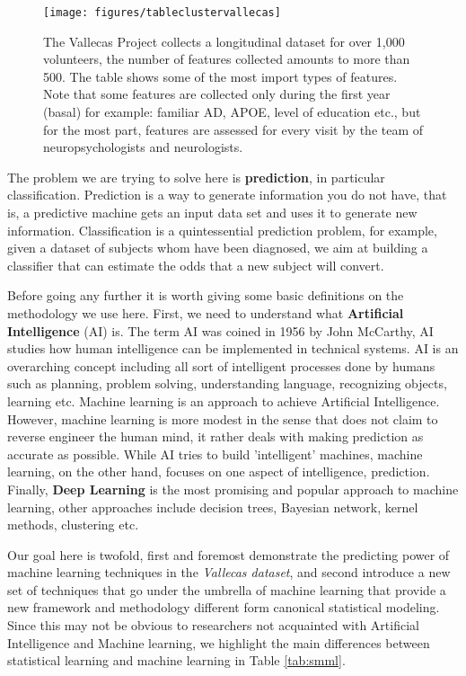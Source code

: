 \documentclass[11pt]{article}
\theoremstyle{definition}
\theoremstyle{remark}
\begin{document}
\begin{figure}[h]
        \centering
        \texttt{[image: figures/tableclustervallecas]}
        \caption{The Vallecas Project collects a longitudinal dataset for over 1,000 volunteers, the number of features collected amounts to more than 500. The table shows some of the most import types of features. Note that some features are collected only during the first year (basal) for example: familiar AD, APOE, level of education etc., but for the most part, features are assessed for every visit by the team of neuropsychologists and neurologists.} \label{fig:tableclustervallecas}
\end{figure}

The problem we are trying to solve here is \textbf{prediction}, in particular classification. 
Prediction is a way to generate information you do not have, that is, a predictive machine gets an input data set and uses it to generate new information. Classification is a quintessential prediction problem, for example, given a dataset of subjects whom have been diagnosed, we aim at building a classifier that can estimate the odds that a new subject will convert. 

Before going any further it is worth giving some basic definitions on the methodology we use here. First, we need to understand what \textbf{Artificial Intelligence} (AI) is. The term AI was coined in 1956 by John McCarthy, AI studies how human intelligence can be implemented in technical systems. AI is an overarching concept including all sort of intelligent processes done by humans such as planning, problem solving, understanding language, recognizing objects, learning etc. 
Machine learning is an approach to achieve Artificial Intelligence. However, machine learning is more modest in the sense that does not claim to reverse engineer the human mind, it rather deals with making prediction as accurate as possible. While AI tries to build 'intelligent' machines, machine learning, on the other hand, focuses on one aspect of intelligence, prediction.
Finally, \textbf{Deep Learning} is the most promising and popular approach to machine learning, other approaches include decision trees, Bayesian network, kernel methods, clustering etc.

Our goal here is twofold, first and foremost demonstrate the predicting power of machine learning techniques in the \emph{Vallecas dataset}, and second introduce a new set of techniques that go under the umbrella of machine learning that provide a new framework and methodology different form canonical statistical modeling. Since this may not be obvious to researchers not acquainted with Artificial Intelligence and Machine learning, we highlight the main differences between statistical learning and machine learning in  Table \ref{tab:smml}.  
\end{document}
